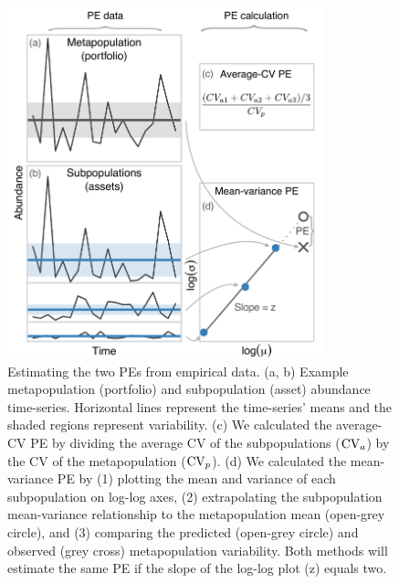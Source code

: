 \begin{figure}[htbp]
  \centering
  \includegraphics[height=4in]{prophets/fig1}
  \caption[Estimating the two PEs from empirical data.]{
  Estimating the two PEs from empirical data. (a, b) Example
    metapopulation (portfolio) and subpopulation (asset) abundance time-series.
    Horizontal lines represent the time-series' means and the shaded regions
    represent variability. (c) We calculated the average-CV PE by dividing the
    average CV of the subpopulations ($\mathrm{CV}_a$) by the CV of the metapopulation
    ($\mathrm{CV}_p$). (d) We calculated the mean-variance PE by (1) plotting the mean
    and variance of each subpopulation on log-log axes, (2) extrapolating the
    subpopulation mean-variance relationship to the metapopulation mean
    (open-grey circle), and (3) comparing the predicted (open-grey circle) and
    observed (grey cross) metapopulation variability. Both methods will
    estimate the same PE if the slope of the log-log plot (z) equals two.
  }
  \label{fig:didactic}
\end{figure}

